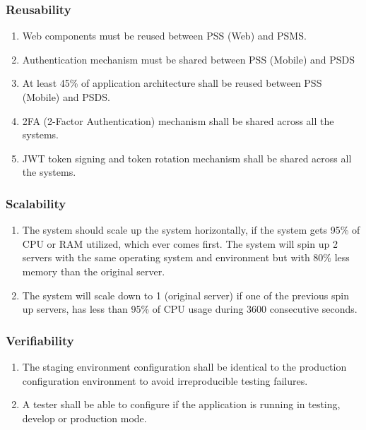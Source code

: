 \subsubsection{Reusability}
\begin{enumerate}[label=REU-\arabic*]
    \item Web components must be reused between PSS (Web) and PSMS.
    \item Authentication mechanism must be shared between PSS (Mobile) and PSDS
    \item At least 45\% of application architecture shall be reused 
    between PSS (Mobile) and PSDS.
    \item 2FA (2-Factor Authentication) mechanism shall be shared across 
    all the systems.
    \item JWT token signing and token rotation mechanism shall be shared 
    across all the systems.
\end{enumerate}

\subsubsection{Scalability}
\begin{enumerate}[label=SCA-\arabic*]
    \item The system should scale up the system horizontally, if the system 
    gets 95\% of CPU or RAM utilized, which ever comes first. The system will 
    spin up 2 servers with the same operating system and environment 
    but with 80\% less memory than the original server.
    \item The system will scale down to 1 (original server) if one of the 
    previous spin up servers, has less than 95\% of CPU usage during 3600 
    consecutive seconds.
\end{enumerate}
\subsubsection{Verifiability}
\begin{enumerate}[label=VER-\arabic*]
    \item The staging environment configuration shall be identical to the 
    production configuration environment to avoid irreproducible 
    testing failures.
    \item A tester shall be able to configure if the application is 
    running in testing, develop or production mode.
\end{enumerate}